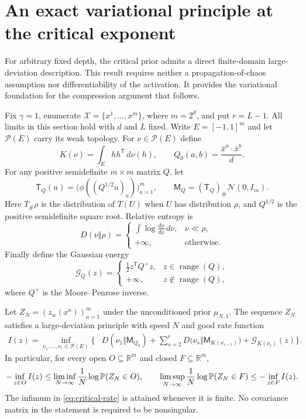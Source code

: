 \section{An exact variational principle at the critical exponent}
\label{sec:critical-variational}

For arbitrary fixed depth, the critical prior admits a direct finite-domain
large-deviation description. This result requires neither a propagation-of-chaos
assumption nor differentiability of the activation. It provides the variational
foundation for the compression argument that follows.

Fix $\gamma=1$, enumerate $\mathcal X=\{x^1,\ldots,x^m\}$, where $m=2^d$,
and put $r=L-1$. All limits in this section hold with $d$ and $L$ fixed.
Write $E=[-1,1]^m$ and let $\mathcal P(E)$ carry its weak topology.
For $\nu\in\mathcal P(E)$ define
\[
 K(\nu)=\int_E hh^{\mathsf T}\,d\nu(h),\qquad
 Q_0(a,b)=\frac{\bar x^a\cdot\bar x^b}{d}.
\]
For any positive semidefinite $m\times m$ matrix $Q$, let
\[
 \mathsf T_Q(u)=\bigl(\phi((Q^{1/2}u)_a)\bigr)_{a=1}^m,
 \qquad
 \mathsf M_Q=(\mathsf T_Q)_\#\mathcal N(0,I_m).
\]
Here $T_\#\rho$ is the distribution of $T(U)$ when $U$ has distribution $\rho$,
and $Q^{1/2}$ is the positive semidefinite square root. Relative entropy is
\[
 D(\nu\Vert\rho)=
 \begin{cases}
 \displaystyle\int\log\frac{d\nu}{d\rho}\,d\nu,&\nu\ll\rho,\\
 +\infty,&\text{otherwise}.
 \end{cases}
\]
Finally define the Gaussian energy
\[
 \mathcal G_Q(z)=
 \begin{cases}
 \frac12 z^{\mathsf T}Q^+z,&z\in\operatorname{range}(Q),\\
 +\infty,&z\notin\operatorname{range}(Q),
 \end{cases}
\]
where $Q^+$ is the Moore--Penrose inverse.

\begin{theorem}
\label{thm:critical-ldp}
Let $Z_N=(z_w(x^a))_{a=1}^m$ under the unconditioned prior
$\mu_{N,1}$. The sequence $Z_N$ satisfies a large-deviation principle
with speed $N$ and good rate function
\begin{equation}\label{eq:critical-rate}
 \begin{split}
 I(z)=\inf_{\nu_1,\ldots,\nu_r\in\mathcal P(E)}
 \bigg\{&D(\nu_1\Vert\mathsf M_{Q_0})
  +\sum_{s=2}^{r}D\bigl(\nu_s\Vert\mathsf M_{K(\nu_{s-1})}\bigr)
  +\mathcal G_{K(\nu_r)}(z)\bigg\}.
 \end{split}
\end{equation}
In particular, for every open $O\subseteq\mathbb R^m$ and closed
$F\subseteq\mathbb R^m$,
\[
 -\inf_{z\in O}I(z)
 \leq\liminf_{N\to\infty}\frac1N\log\mathbb P(Z_N\in O),
 \qquad
 \limsup_{N\to\infty}\frac1N\log\mathbb P(Z_N\in F)
 \leq-\inf_{z\in F}I(z).
\]
The infimum in \eqref{eq:critical-rate} is attained whenever it is finite.
No covariance matrix in the statement is required to be nonsingular.
\end{theorem}

